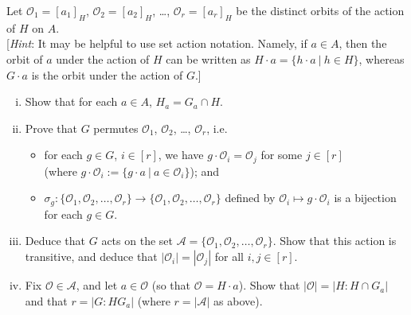 \documentclass[11pt, reqno]{amsart}
\theoremstyle{plain}
\theoremstyle{definition}
\theoremstyle{example}
\def\cA{\mathcal{A}}\def\cB{\mathcal{B}}\def\cC{\mathcal{C}}\def\cD{\mathcal{D}}\def\cE{\mathcal{E}}\def\cF{\mathcal{F}}\def\cG{\mathcal{G}}\def\cH{\mathcal{H}}\def\cI{\mathcal{I}}\def\cJ{\mathcal{J}}\def\cK{\mathcal{K}}\def\cL{\mathcal{L}}\def\cM{\mathcal{M}}\def\cN{\mathcal{N}}\def\cO{\mathcal{O}}\def\cP{\mathcal{P}}\def\cQ{\mathcal{Q}}\def\cR{\mathcal{R}}\def\cS{\mathcal{S}}\def\cT{\mathcal{T}}\def\cU{\mathcal{U}}\def\cV{\mathcal{V}}\def\cW{\mathcal{W}}\def\cX{\mathcal{X}}\def\cY{\mathcal{Y}}\def\cZ{\mathcal{Z}}
\begin{document}
\begin{enumerate}[1.]
\begin{enumerate}[(a)]
Let $\cO_1 = [a_1]_H$, $\cO_2= [a_2]_H$, \dots, $\cO_r= [a_r]_H$ be the distinct orbits of the action of $H$ on $A$. \\
{[\emph{Hint}: It may be helpful to use set action notation. Namely, if $a \in A$, then the orbit of $a$ under the action of $H$ can be written as $H \cdot a = \{h\cdot a ~|~ h \in H \}$, whereas $G \cdot a$ is the orbit under the action of $G$.]}
\begin{enumerate}[(i)]
\item Show that for each $a \in A$, $H_a = G_a \cap H$. 
\item Prove that $G$ permutes $\cO_1$, $\cO_2$, \dots, $\cO_r$, i.e.
	\begin{itemize}
	\item for each $g \in G$, $i \in [r]$, we have $g \cdot \cO_i = \cO_j$  for some  $j \in [r]$ \\
		(where $g \cdot \cO_i := \{g \cdot a ~|~ a \in \cO_i\}$); and 
	\item $\sigma_g: \{\cO_1, \cO_2, \dots, \cO_r\} \to \{\cO_1, \cO_2, \dots, \cO_r\}$ defined by $ \cO_i \mapsto g \cdot \cO_i$ is a bijection for each $g \in G$.
	\end{itemize}
\item Deduce that $G$ acts on the set $\cA = \{\cO_1, \cO_2, \dots, \cO_r\}$. Show that this action is transitive, and deduce that $|\cO_i| = |\cO_j|$ for all $i, j \in [r]$. 
\item Fix $\cO \in \cA$, and let $a \in \cO$ (so that $\cO = H \cdot a$). Show that $|\cO| = |H: H \cap G_a|$ and that $r = |G :  HG_a|$ (where $r = |\cA|$ as above).\\
\end{enumerate}
\end{enumerate}


\end{enumerate}
\end{document}
